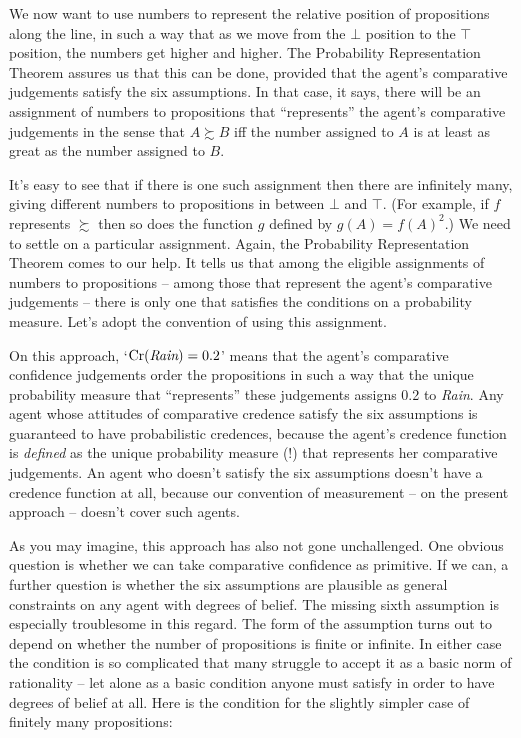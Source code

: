 We now want to use numbers to represent the relative position of propositions
along the line, in such a way that as we move from the $\bot$ position to the
$\top$ position, the numbers get higher and higher. The Probability
Representation Theorem assures us that this can be done, provided that the
agent's comparative judgements satisfy the six assumptions. In that case, it
says, there will be an assignment of numbers to propositions that ``represents''
the agent's comparative judgements in the sense that $A \succsim B$ iff the
number assigned to $A$ is at least as great as the number assigned to $B$.

It's easy to see that if there is one such assignment then there are
infinitely many, giving different numbers to propositions in between $\bot$ and
$\top$. (For example, if $f$ represents $\succsim$ then so does the function $g$
defined by $g(A) = f(A)^{2}$.) We need to settle on a particular assignment.
Again, the Probability Representation Theorem comes to our help. It tells us
that among the eligible assignments of numbers to propositions -- among those
that represent the agent's comparative judgements -- there is only one that
satisfies the conditions on a probability measure. Let's adopt the convention of
using this assignment.

On this approach, `$\text{Cr}(\emph{Rain}) = 0.2$' means that the agent's comparative
confidence judgements order the propositions in such a way that the unique
probability measure that ``represents'' these judgements assigns 0.2 to
\emph{Rain}. Any agent whose attitudes of comparative credence satisfy the six
assumptions is guaranteed to have probabilistic credences, because the agent's
credence function is \emph{defined} as the unique probability measure (!) that
represents her comparative judgements. An agent who doesn't satisfy the six
assumptions doesn't have a credence function at all, because our convention of
measurement -- on the present approach -- doesn't cover such agents.

As you may imagine, this approach has also not gone unchallenged. One obvious
question is whether we can take comparative confidence as primitive. If we can,
a further question is whether the six assumptions are plausible as general
constraints on any agent with degrees of belief. The missing sixth assumption is
especially troublesome in this regard. The form of the assumption turns out to
depend on whether the number of propositions is finite or infinite. In either
case the condition is so complicated that many struggle to accept it as a basic
norm of rationality -- let alone as a basic condition anyone must satisfy in
order to have degrees of belief at all. Here is the
condition for the slightly simpler case of finitely many propositions:

